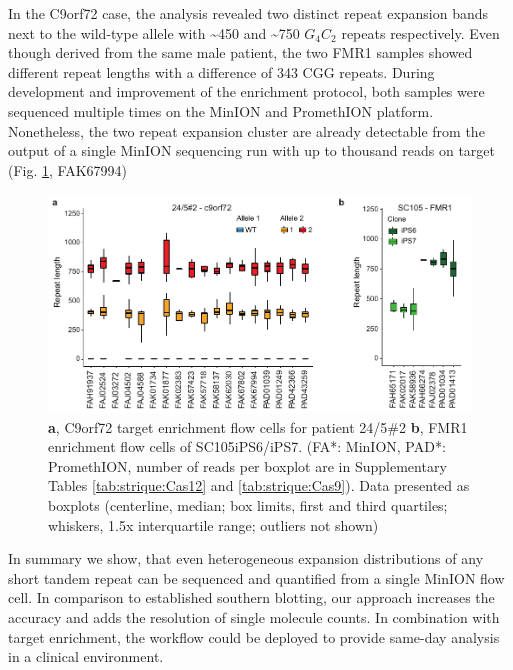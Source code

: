 In the C9orf72 case, the analysis revealed two distinct repeat expansion bands next to the wild-type allele with \textasciitilde450 and \textasciitilde750 $ G_{4}C_{2} $ repeats respectively. Even though derived from the same male patient, the two FMR1 samples showed different repeat lengths with a difference of 343 CGG repeats. During development and improvement of the enrichment protocol, both samples were sequenced multiple times on the MinION and PromethION platform. Nonetheless, the two repeat expansion cluster are already detectable from the output of a single MinION sequencing run with up to thousand reads on target (Fig. \ref{fig:strique:count_experiments}, FAK67994)


\begin{figure}[h]
    \centering
    \includegraphics[width=1.0\textwidth]{figures/strique/count_experiments.pdf}
    \captionsetup{format=plain}
    \caption[Repeat count cluster stability over experiments]{\textbf{a}, C9orf72 target enrichment flow cells for patient 24/5\#2 \textbf{b}, FMR1 enrichment flow cells of SC105iPS6/iPS7. (FA*: MinION, PAD*: PromethION, number of reads per boxplot are in Supplementary Tables \ref{tab:strique:Cas12} and \ref{tab:strique:Cas9}). Data presented as boxplots (centerline, median; box limits, first and third quartiles; whiskers, 1.5x interquartile range; outliers not shown)}
    \label{fig:strique:count_experiments}
\end{figure}

In summary we show, that even heterogeneous expansion distributions of any short tandem repeat can be sequenced and quantified from a single MinION flow cell. In comparison to established southern blotting, our approach increases the accuracy and adds the resolution of single molecule counts. In combination with target enrichment, the workflow could be deployed to provide same-day analysis in a clinical environment.




